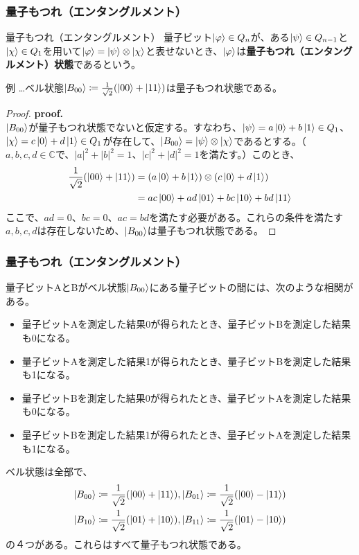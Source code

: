 \documentclass[9pt]{beamer}
\begin{document}
\begin{frame}
  \frametitle{量子もつれ（エンタングルメント）}
  \begin{block}{量子もつれ（エンタングルメント）}
    量子ビット$\ket{\varphi} \in Q_n$が、ある$\ket{\psi} \in Q_{n-1}$と$\ket{\chi} \in Q_1$を用いて$\ket{\varphi} = \ket{\psi} \otimes \ket{\chi}$と表せないとき、$\ket{\varphi}$は\textbf{量子もつれ（エンタングルメント）状態}であるという。
  \end{block}
  例 \dots ベル状態$\ket{B_{00}} \coloneq \frac{1}{\sqrt{2}}(\ket{00} + \ket{11})$は量子もつれ状態である。
  \begin{proof}
    \textbf{proof.} \\
    $\ket{B_{00}}$が量子もつれ状態でないと仮定する。すなわち、$\ket{\psi} = a\ket{0} + b\ket{1} \in Q_1$、$\ket{\chi} = c\ket{0} + d\ket{1} \in Q_1$が存在して、$\ket{B_{00}} = \ket{\psi} \otimes \ket{\chi}$であるとする。（$a, b, c, d \in \mathbb{C}$で、$|a|^2 + |b|^2 = 1$、$|c|^2 + |d|^2 = 1$を満たす。）このとき、
    \begin{align}
      \frac{1}{\sqrt{2}}(\ket{00} + \ket{11}) &= (a\ket{0} + b\ket{1}) \otimes (c\ket{0} + d\ket{1}) \\
      &= ac\ket{00} + ad\ket{01} + bc\ket{10} + bd\ket{11}
    \end{align}
    ここで、$ad = 0$、$bc = 0$、$ac = bd$を満たす必要がある。これらの条件を満たす$a, b, c, d$は存在しないため、$\ket{B_{00}}$は量子もつれ状態である。
  \end{proof}
\end{frame}

\begin{frame}
  \frametitle{量子もつれ（エンタングルメント）}
  量子ビットAとBがベル状態$\ket{B_{00}}$にある量子ビットの間には、次のような相関がある。
  \begin{itemize}
    \item 量子ビットAを測定した結果0が得られたとき、量子ビットBを測定した結果も0になる。
    \item 量子ビットAを測定した結果1が得られたとき、量子ビットBを測定した結果も1になる。
    \item 量子ビットBを測定した結果0が得られたとき、量子ビットAを測定した結果も0になる。
    \item 量子ビットBを測定した結果1が得られたとき、量子ビットAを測定した結果も1になる。
  \end{itemize}
  ベル状態は全部で、
\begin{align}
  \ket{B_{00}} &\coloneq \frac{1}{\sqrt{2}}(\ket{00} + \ket{11}), \ket{B_{01}} \coloneq \frac{1}{\sqrt{2}}(\ket{00} - \ket{11})\\
   \ket{B_{10}} &\coloneq \frac{1}{\sqrt{2}}(\ket{01} + \ket{10}), \ket{B_{11}} \coloneq \frac{1}{\sqrt{2}}(\ket{01} - \ket{10})
\end{align}
の４つがある。これらはすべて量子もつれ状態である。
\end{frame}
\end{document}
